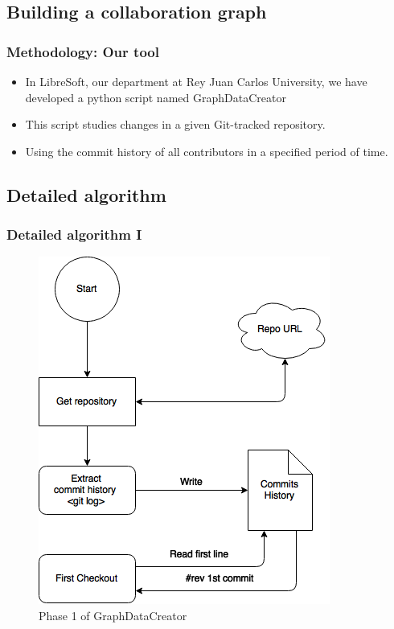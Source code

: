 \documentclass{beamer}
\begin{document}
\subsection{Building a collaboration graph}
\begin{frame}
\frametitle{Methodology: Our tool}
\begin{itemize}
\item In LibreSoft, our department at Rey Juan Carlos University,
we have developed a python script named GraphDataCreator 
\item This script studies changes in a given 
Git-tracked repository.
\item Using the commit history of all contributors in a specified period of time.
\end{itemize}
\end{frame}

\subsection{Detailed algorithm}

\begin{frame}
\frametitle{Detailed algorithm I}
\begin{figure}
\includegraphics[scale=0.4]{GDCphase1.png} 
\caption{Phase 1 of GraphDataCreator}
\label{fig:phase1}
\end{figure}
\end{frame}
\end{document}
